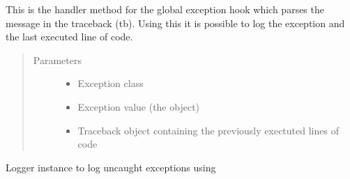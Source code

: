 \documentclass[letterpaper,10pt,english]{sphinxmanual}
\begin{document}
\begin{fulllineitems}
\begin{fulllineitems}
\end{fulllineitems}


\begin{fulllineitems}
\label{\detokenize{src:src.CANalyzat0r.MainWindow.staticMetaObject}}
\end{fulllineitems}


\end{fulllineitems}


\begin{fulllineitems}
\label{\detokenize{src:src.CANalyzat0r.globalLoggingHandler}}
This is the handler method for the global exception hook which parses the message in the traceback (tb).
Using this it is possible to log the exception and the last executed line of code.
\begin{quote}\begin{description}
\item[{Parameters}] \leavevmode\begin{itemize}
\item {} 
 \textendash{} Exception class

\item {} 
 \textendash{} Exception value (the object)

\item {} 
 \textendash{} Traceback object containing the previously exectuted lines of code

\end{itemize}

\end{description}\end{quote}

\end{fulllineitems}


\begin{fulllineitems}
\label{\detokenize{src:src.CANalyzat0r.uncaughtExceptionLogger}}
Logger instance to log uncaught exceptions using {\hyperref[\detokenize{src:src.CANalyzat0r.globalLoggingHandler}]{}}

\end{fulllineitems}
\end{document}
